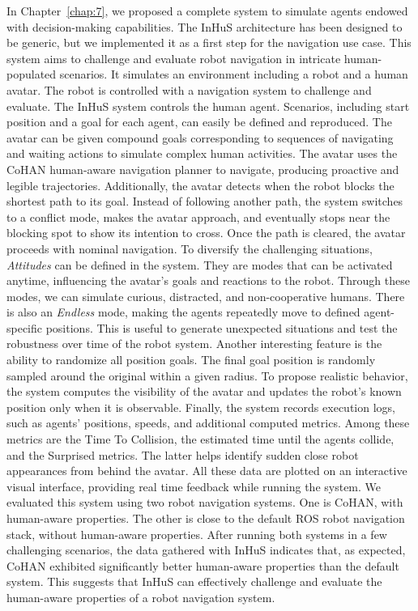 

In Chapter~\ref{chap:7}, we proposed a complete system to simulate agents endowed with decision-making capabilities. The InHuS architecture has been designed to be generic, but we implemented it as a first step for the navigation use case. 
This system aims to challenge and evaluate robot navigation in intricate human-populated scenarios. It simulates an environment including a robot and a human avatar. The robot is controlled with a navigation system to challenge and evaluate. The InHuS system controls the human agent. Scenarios, including start position and a goal for each agent, can easily be defined and reproduced. The avatar can be given compound goals corresponding to sequences of navigating and waiting actions to simulate complex human activities. 
The avatar uses the CoHAN human-aware navigation planner to navigate, producing proactive and legible trajectories. 
Additionally, the avatar detects when the robot blocks the shortest path to its goal. Instead of following another path, the system switches to a conflict mode, makes the avatar approach, and eventually stops near the blocking spot to show its intention to cross. Once the path is cleared, the avatar proceeds with nominal navigation.
To diversify the challenging situations, \textit{Attitudes} can be defined in the system. They are modes that can be activated anytime, influencing the avatar's goals and reactions to the robot. Through these modes, we can simulate curious, distracted, and non-cooperative humans. There is also an \textit{Endless} mode, making the agents repeatedly move to defined agent-specific positions. This is useful to generate unexpected situations and test the robustness over time of the robot system. Another interesting feature is the ability to randomize all position goals. The final goal position is randomly sampled around the original within a given radius. 
To propose realistic behavior, the system computes the visibility of the avatar and updates the robot's known position only when it is observable. 
Finally, the system records execution logs, such as agents' positions, speeds, and additional computed metrics. Among these metrics are the Time To Collision, the estimated time until the agents collide, and the Surprised metrics. The latter helps identify sudden close robot appearances from behind the avatar. All these data are plotted on an interactive visual interface, providing real time feedback while running the system.
We evaluated this system using two robot navigation systems. One is CoHAN, with human-aware properties. The other is close to the default ROS robot navigation stack, without human-aware properties.
After running both systems in a few challenging scenarios, the data gathered with InHuS indicates that, as expected, CoHAN exhibited significantly better human-aware properties than the default system. This suggests that InHuS can effectively challenge and evaluate the human-aware properties of a robot navigation system. 

